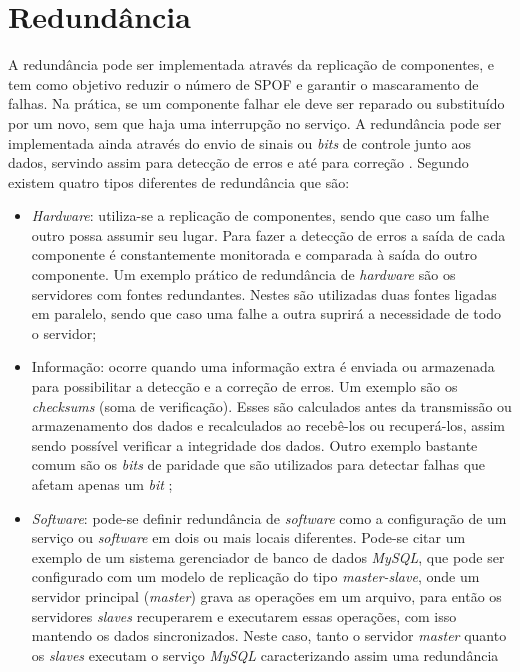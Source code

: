 \section{Redundância}
\label{section:redundancia}

A redundância pode ser implementada através da replicação de componentes, e tem como objetivo reduzir o número de \ac{SPOF} e garantir 
o mascaramento de falhas. Na prática, se um componente falhar ele deve ser reparado ou substituído por um novo, sem que haja uma 
interrupção no serviço. A redundância pode ser implementada ainda através do envio de sinais ou \textit{bits} de controle junto aos dados, 
servindo assim para detecção de erros e até para correção \cite{weber2002}. Segundo \cite{norvag2000} existem quatro tipos diferentes 
de redundância que são:
\begin{itemize}
 \item \textit{Hardware}: utiliza-se a replicação de componentes, sendo que caso um falhe outro possa assumir seu lugar. 
 Para fazer a detecção de erros a saída de cada componente é constantemente monitorada e comparada à saída do outro componente.
 Um exemplo prático de redundância de \textit{hardware} são os servidores com fontes redundantes. Nestes são utilizadas duas fontes ligadas 
 em paralelo, sendo que caso uma falhe a outra suprirá a necessidade de todo o servidor;
 \item Informação: ocorre quando uma informação extra é enviada ou armazenada para possibilitar a detecção e a correção de erros.
 Um exemplo são os \textit{checksums} (soma de verificação). Esses são calculados antes da transmissão ou armazenamento dos dados 
 e recalculados ao recebê-los ou recuperá-los, assim sendo possível verificar a integridade dos dados. Outro exemplo bastante comum são os 
 \textit{bits} de paridade que são utilizados para detectar falhas que afetam apenas um \textit{bit} \cite{weber2002};
 \item \textit{Software}: pode-se definir redundância de \textit{software} como a configuração de um serviço ou \textit{software} em
 dois ou mais locais diferentes. Pode-se citar um exemplo de um sistema gerenciador de banco de dados \textit{MySQL}, que pode ser configurado 
 com um modelo de replicação do tipo \textit{master-slave}, onde um servidor principal (\textit{master}) grava as operações em um arquivo, 
 para então os servidores \textit{slaves} recuperarem e executarem essas operações, com isso mantendo os dados sincronizados. Neste caso, 
 tanto o servidor \textit{master} quanto os \textit{slaves} executam o serviço \textit{MySQL} caracterizando assim uma redundância 

\end{itemize}
